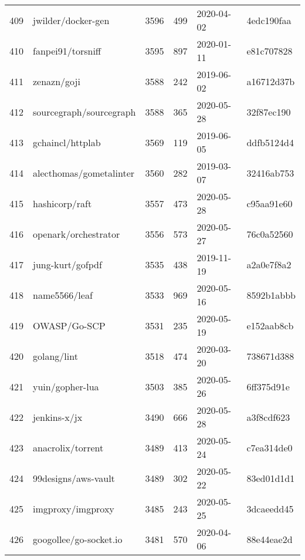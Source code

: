 \begin{longtable}{llrrll}
    409 &                                 jwilder/docker-gen &   3596 &    499 & 2020-04-02 &  4edc190faa \\
    410 &                                  fanpei91/torsniff &   3595 &    897 & 2020-01-11 &  e81c707828 \\
    411 &                                        zenazn/goji &   3588 &    242 & 2019-06-02 &  a16712d37b \\
    412 &                            sourcegraph/sourcegraph &   3588 &    365 & 2020-05-28 &  32f87ec190 \\
    413 &                                   gchaincl/httplab &   3569 &    119 & 2019-06-05 &  ddfb5124d4 \\
    414 &                            alecthomas/gometalinter &   3560 &    282 & 2019-03-07 &  32416ab753 \\
    415 &                                     hashicorp/raft &   3557 &    473 & 2020-05-28 &  c95aa91e60 \\
    416 &                               openark/orchestrator &   3556 &    573 & 2020-05-27 &  76c0a52560 \\
    417 &                                   jung-kurt/gofpdf &   3535 &    438 & 2019-11-19 &  a2a0e7f8a2 \\
    418 &                                      name5566/leaf &   3533 &    969 & 2020-05-16 &  8592b1abbb \\
    419 &                                       OWASP/Go-SCP &   3531 &    235 & 2020-05-19 &  e152aab8cb \\
    420 &                                        golang/lint &   3518 &    474 & 2020-03-20 &  738671d388 \\
    421 &                                    yuin/gopher-lua &   3503 &    385 & 2020-05-26 &  6ff375d91e \\
    422 &                                       jenkins-x/jx &   3490 &    666 & 2020-05-28 &  a3f8cdf623 \\
    423 &                                  anacrolix/torrent &   3489 &    413 & 2020-05-24 &  c7ea314de0 \\
    424 &                                99designs/aws-vault &   3489 &    302 & 2020-05-22 &  83ed01d1d1 \\
    425 &                                  imgproxy/imgproxy &   3485 &    243 & 2020-05-25 &  3dcaeedd45 \\
    426 &                             googollee/go-socket.io &   3481 &    570 & 2020-04-06 &  88e44eae2d \\

\end{longtable}
